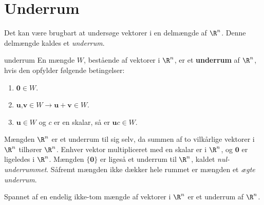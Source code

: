 \section{Underrum}
Det kan være brugbart at undersøge vektorer i en delmængde af $\R^n$.
Denne delmængde kaldes et \textit{underrum}.
%
\begin{defn}{}{underrum}
En mængde $W$, bestående af vektorer i $\R^n$, er et \textbf{underrum} af $\R^n$, hvis den opfylder følgende betingelser:	
\begin{enumerate}[label=(\alph*)]
\item $\textbf{0}\in W$.
\item $\textbf{u}$,$\textbf{v} \in W \rightarrow \textbf{u}+\textbf{v} \in W $.
\item $\textbf{u} \in W$ og $c$ er en skalar, så er $\textbf{u}c \in W$.
\end{enumerate}
\end{defn}
\noindent
Mængden $\R^n$ er et underrum til sig selv, da summen af to vilkårlige vektorer i $\R^n$ tilhører $\R^n$.
Enhver vektor multipliceret med en skalar er i $\R^n$, og $\textbf{0}$ er ligeledes i $\R^n$. 
Mængden $\{\textbf{0}\}$ er ligeså et underrum til $\R^n$, kaldet \textit{nul-underrummet}.
Såfremt mængden ikke dækker hele rummet er mængden et \textit{ægte underrum}.
%
%
\begin{thm}{}{}
Spannet af en endelig ikke-tom mængde af vektorer i $\R^n$ er et underrum af $\R^n$.
\end{thm}
%

